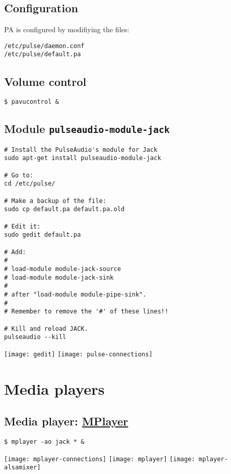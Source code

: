 \section{Configuration}
PA is configured by modifiying the files:
\begin{verbatim}
/etc/pulse/daemon.conf
/etc/pulse/default.pa
\end{verbatim}

\section{Volume control}
\begin{verbatim}
$ pavucontrol &
\end{verbatim}

\section{Module \texttt{pulseaudio-module-jack}}
\begin{verbatim}
# Install the PulseAudio's module for Jack
sudo apt-get install pulseaudio-module-jack

# Go to:
cd /etc/pulse/

# Make a backup of the file:
sudo cp default.pa default.pa.old

# Edit it:
sudo gedit default.pa

# Add:
#
# load-module module-jack-source
# load-module module-jack-sink
#
# after "load-module module-pipe-sink".
#
# Remember to remove the '#' of these lines!!

# Kill and reload JACK.
pulseaudio --kill
\end{verbatim}
\begin{center}
  \texttt{[image: gedit]}
  \texttt{[image: pulse-connections]}
\end{center}

\chapter{Media players}

\section{Media player: \href{http://www.mplayerhq.hu/}{MPlayer}}

\begin{verbatim}
$ mplayer -ao jack * &
\end{verbatim}
\begin{center}
  \texttt{[image: mplayer-connections]}
  \texttt{[image: mplayer]}
  \texttt{[image: mplayer-alsamixer]}
\end{center}

